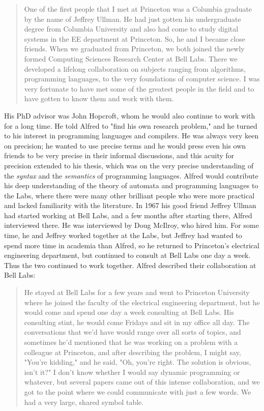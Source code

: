 \begin{quotation}
	One of the first people that I met at Princeton was a Columbia graduate by the name of Jeffrey
	Ullman. He had just gotten his undergraduate degree from Columbia University and also had come to
	study digital systems in the EE department at Princeton. So, he and I became close friends. When we
	graduated from Princeton, we both joined the newly formed Computing Sciences Research Center at Bell
	Labs. There we developed a lifelong collaboration on subjects ranging from algorithms, programming
	languages, to the very foundations of computer science. I was very fortunate to have met some of the
	greatest people in the field and to have gotten to know them and work with them.
\end{quotation}

His PhD advisor was John Hopcroft, whom he would also continue to work with for a long time.
He told Alfred to "find his own research problem," and he turned to his interest in
programming languages and compilers.
He was always very keen on precision; he wanted to use precise terms and he would
press even his own friends to be very precise in their informal discussions, and
this acuity for precision extended to his thesis, which was on the very precise
understanding of the \textit{syntax} and the \textit{semantics} of programming languages.
Alfred would contribute his deep understanding of the theory of automata and programming
languages to the Labs, where there were many other brilliant people who were more practical
and lacked familiarity with the literature.
In 1967 his good friend Jeffrey Ullman had started working at Bell Labs, and a few months
after starting there, Alfred interviewed there.
He was interviewed by Doug McIlroy, who hired him.
For some time, he and Jeffrey worked together at the Labs, but Jeffrey had wanted to
spend more time in academia than Alfred, so he returned to Princeton's electrical
engineering department, but continued to consult at Bell Labs one day a week.
Thus the two continued to work together.
Alfred described their collaboration at Bell Labs:

\begin{quotation}
	He stayed at Bell Labs for a few years and went to Princeton University where he
	joined the faculty of the electrical engineering department, but he would come and spend one day a
	week consulting at Bell Labs. His consulting stint, he would come Fridays and sit in my office
	all day. The conversations that we'd have would range over all sorts of topics, and sometimes he'd
	mentioned that he was working on a problem with a colleague at Princeton, and after describing the
	problem, I might say, "You're kidding," and he said, "Oh, you're right. The solution is obvious,
	isn't it?" I don't know whether I would say dynamic programming or whatever, but several papers
	came out of this intense collaboration, and we got to the point where we could communicate with just
	a few words. We had a very large, shared symbol table.
	\cite{aho_oral_history_2022}
\end{quotation}

